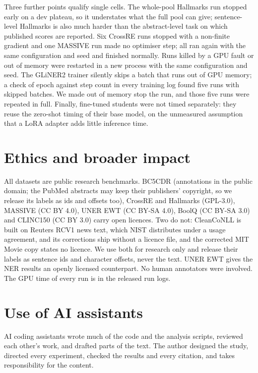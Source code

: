 \documentclass[11pt]{article}
\begin{document}
Three further points qualify single cells. The whole-pool Hallmarks run stopped early on a dev plateau, so it understates what the full pool can give; sentence-level Hallmarks is also much harder than the abstract-level task on which published scores are reported. Six CrossRE runs stopped with a non-finite gradient and one MASSIVE run made no optimiser step; all ran again with the same configuration and seed and finished normally. Runs killed by a GPU fault or out of memory were restarted in a new process with the same configuration and seed. The GLiNER2 trainer silently skips a batch that runs out of GPU memory; a check of epoch against step count in every training log found five runs with skipped batches. We made out of memory stop the run, and those five runs were repeated in full. Finally, fine-tuned students were not timed separately: they reuse the zero-shot timing of their base model, on the unmeasured assumption that a LoRA adapter adds little inference time.

\section*{Ethics and broader impact}

All datasets are public research benchmarks. BC5CDR (annotations in the public domain; the PubMed abstracts may keep their publishers' copyright, so we release its labels as ids and offsets too), CrossRE and Hallmarks (GPL-3.0), MASSIVE (CC BY 4.0), UNER EWT (CC BY-SA 4.0), BoolQ (CC BY-SA 3.0) and CLINC150 (CC BY 3.0) carry open licences. Two do not: CleanCoNLL is built on Reuters RCV1 news text, which NIST distributes under a usage agreement, and its corrections ship without a licence file, and the corrected MIT Movie copy states no licence. We use both for research only and release their labels as sentence ids and character offsets, never the text. UNER EWT gives the NER results an openly licensed counterpart. No human annotators were involved. The GPU time of every run is in the released run logs.

\section*{Use of AI assistants}

AI coding assistants wrote much of the code and the analysis scripts, reviewed each other's work, and drafted parts of the text. The author designed the study, directed every experiment, checked the results and every citation, and takes responsibility for the content.
\end{document}
